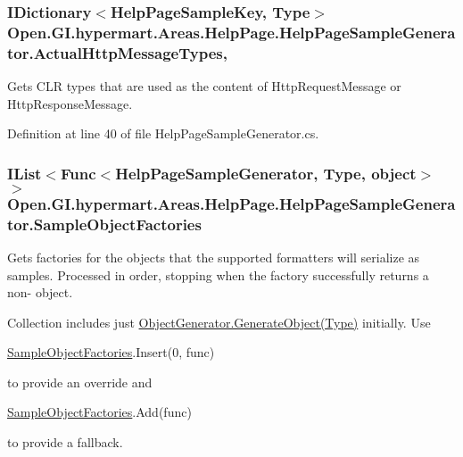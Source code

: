 \subsubsection[{Actual\+Http\+Message\+Types}]{\setlength{\rightskip}{0pt plus 5cm}I\+Dictionary$<${\bf Help\+Page\+Sample\+Key}, Type$>$ Open.\+G\+I.\+hypermart.\+Areas.\+Help\+Page.\+Help\+Page\+Sample\+Generator.\+Actual\+Http\+Message\+Types\hspace{0.3cm}{\ttfamily [get]}, {\ttfamily [set]}}\label{class_open_1_1_g_i_1_1hypermart_1_1_areas_1_1_help_page_1_1_help_page_sample_generator_a62bbf2941b3a4e2db28a546ae2fc5857}


Gets C\+L\+R types that are used as the content of Http\+Request\+Message or Http\+Response\+Message. 



Definition at line 40 of file Help\+Page\+Sample\+Generator.\+cs.

\hypertarget{class_open_1_1_g_i_1_1hypermart_1_1_areas_1_1_help_page_1_1_help_page_sample_generator_a659aa13a69376385d931264d06fbd398}{}
\subsubsection[{Sample\+Object\+Factories}]{\setlength{\rightskip}{0pt plus 5cm}I\+List$<$Func$<${\bf Help\+Page\+Sample\+Generator}, Type, object$>$ $>$ Open.\+G\+I.\+hypermart.\+Areas.\+Help\+Page.\+Help\+Page\+Sample\+Generator.\+Sample\+Object\+Factories\hspace{0.3cm}{\ttfamily [get]}}\label{class_open_1_1_g_i_1_1hypermart_1_1_areas_1_1_help_page_1_1_help_page_sample_generator_a659aa13a69376385d931264d06fbd398}


Gets factories for the objects that the supported formatters will serialize as samples. Processed in order, stopping when the factory successfully returns a non-\/ object. 

Collection includes just \hyperlink{class_open_1_1_g_i_1_1hypermart_1_1_areas_1_1_help_page_1_1_object_generator_a118924d1ff5f565e6e9c2893d36f35d2}{Object\+Generator.\+Generate\+Object(\+Type)} initially. Use 
\begin{DoxyCode}
\hyperlink{class_open_1_1_g_i_1_1hypermart_1_1_areas_1_1_help_page_1_1_help_page_sample_generator_a659aa13a69376385d931264d06fbd398}{SampleObjectFactories}.Insert(0, func)
\end{DoxyCode}
 to provide an override and 
\begin{DoxyCode}
\hyperlink{class_open_1_1_g_i_1_1hypermart_1_1_areas_1_1_help_page_1_1_help_page_sample_generator_a659aa13a69376385d931264d06fbd398}{SampleObjectFactories}.Add(func)
\end{DoxyCode}
 to provide a fallback.

